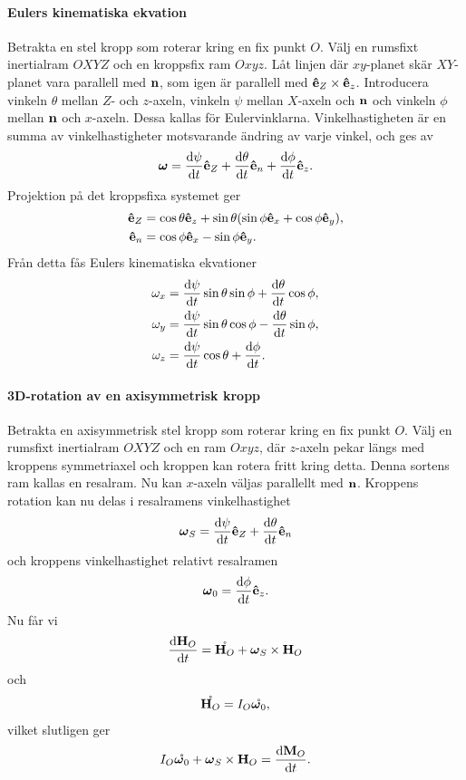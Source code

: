 \paragraph{Eulers kinematiska ekvation}
Betrakta en stel kropp som roterar kring en fix punkt $O$. Välj en rumsfixt inertialram $OXYZ$ och en kroppsfix ram $Oxyz$. Låt linjen där $xy$-planet skär $XY$-planet vara parallell med $\vb{n}$, som igen är parallell med $\vu{e}_{Z}\times\vu{e}_{z}$. Introducera vinkeln $\theta$ mellan $Z$- och $z$-axeln, vinkeln $\psi$ mellan $X$-axeln och $\vb{n}$ och vinkeln $\phi$ mellan $\vb{n}$ och $x$-axeln. Dessa kallas för Eulervinklarna. Vinkelhastigheten är en summa av vinkelhastigheter motsvarande ändring av varje vinkel, och ges av
\begin{align*}
	\vb*{\omega} = \dv{\psi}{t}\vu{e}_{Z} + \dv{\theta}{t}\vu{e}_{n} + \dv{\phi}{t}\vu{e}_{z}.
\end{align*}
Projektion på det kroppsfixa systemet ger
\begin{align*}
	\vu{e}_{Z} &= \cos{\theta}\vu{e}_{z} + \sin{\theta}(\sin{\phi}\vu{e}_{x} + \cos{\phi}\vu{e}_{y}), \\
	\vu{e}_{n} &= \cos{\phi}\vu{e}_{x} - \sin{\phi}\vu{e}_{y}.
\end{align*}
Från detta fås Eulers kinematiska ekvationer
\begin{align*}
	\omega_{x} &= \dv{\psi}{t}\sin{\theta}\sin{\phi} + \dv{\theta}{t}\cos{\phi}, \\
	\omega_{y} &= \dv{\psi}{t}\sin{\theta}\cos{\phi} - \dv{\theta}{t}\sin{\phi}, \\
	\omega_{z} &= \dv{\psi}{t}\cos{\theta} + \dv{\phi}{t}.
\end{align*}

\paragraph{3D-rotation av en axisymmetrisk kropp}
Betrakta en axisymmetrisk stel kropp som roterar kring en fix punkt $O$. Välj en rumsfixt inertialram $OXYZ$ och en ram $Oxyz$, där $z$-axeln pekar längs med kroppens symmetriaxel och kroppen kan rotera fritt kring detta. Denna sortens ram kallas en resalram. Nu kan $x$-axeln väljas parallellt med $\vb{n}$. Kroppens rotation kan nu delas i resalramens vinkelhastighet
\begin{align*}
	\vb*{\omega}_{S} = \dv{\psi}{t}\vu{e}_{Z} + \dv{\theta}{t}\vu{e}_{n}
\end{align*}
och kroppens vinkelhastighet relativt resalramen
\begin{align*}
	\vb*{\omega}_{0} = \dv{\phi}{t}\vu{e}_{z}.
\end{align*}
Nu får vi
\begin{align*}
	\dv{\vb{H}_{O}}{t} = \mathring{\vb{H}_{O}} + \vb*{\omega}_{S}\times\vb{H}_{O}
\end{align*}
och
\begin{align*}
	\mathring{\vb{H}_{O}} = I_{O}\mathring{\vb*{\omega}_{0}},
\end{align*}
vilket slutligen ger
\begin{align*}
	I_{O}\mathring{\vb*{\omega}_{0}} + \vb*{\omega}_{S}\times\vb{H}_{O} = \dv{\vb{M}_{O}}{t}.
\end{align*}
